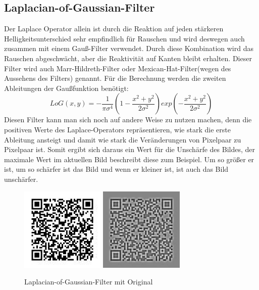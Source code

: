 \subsection*{Laplacian-of-Gaussian-Filter}
\label{sec:LoG}
Der Laplace Operator allein ist durch die Reaktion auf jeden stärkeren Helligkeitsunterschied sehr empfindlich für Rauschen und wird deswegen auch zusammen mit einem Gauß-Filter verwendet. Durch diese Kombination wird das Rauschen abgeschwächt, aber die Reaktivität auf Kanten bleibt erhalten. Dieser Filter wird auch Marr-Hildreth-Filter oder Mexican-Hat-Filter(wegen des Aussehens des Filters) genannt. Für die Berechnung werden die zweiten Ableitungen der Gaußfunktion benötigt:
\begin{equation}
  LoG(x,y) = -\frac{1}{\pi \sigma^4}(1-\frac{x^2 + y^2}{2\sigma^2}) exp(-\frac{x^2 + y^2}{2\sigma^2})
\end{equation}
Diesen Filter kann man sich noch auf andere Weise zu nutzen machen, denn die positiven Werte des Laplace-Operators repräsentieren, wie stark die erste Ableitung ansteigt und damit wie stark die Veränderungen von Pixelpaar zu Pixelpaar ist. Somit ergibt sich daraus ein Wert für die Unschärfe des Bildes, der maximale Wert im aktuellen Bild beschreibt diese zum Beispiel. Um so größer er ist, um so schärfer ist das Bild und wenn er kleiner ist, ist auch das Bild unschärfer.
\begin{figure}[H]
  \centering
  \includegraphics[height=4cm]{img/QR/perfect_03.jpg}
  \includegraphics[height=4cm]{img/QR/qr-LoG.jpg}
  \caption{Laplacian-of-Gaussian-Filter mit Original}
  \label{fig:sharpgauss}
\end{figure}
